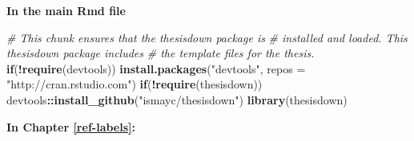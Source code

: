 \documentclass[12pt,twoside]{reedthesis}
\newenvironment{Shaded}{\begin{snugshade}}{\end{snugshade}}
\newcommand{\CommentTok}[1]{\textcolor[rgb]{0.56,0.35,0.01}{\textit{#1}}}
\newcommand{\ControlFlowTok}[1]{\textcolor[rgb]{0.13,0.29,0.53}{\textbf{#1}}}
\newcommand{\DataTypeTok}[1]{\textcolor[rgb]{0.13,0.29,0.53}{#1}}
\newcommand{\KeywordTok}[1]{\textcolor[rgb]{0.13,0.29,0.53}{\textbf{#1}}}
\newcommand{\NormalTok}[1]{#1}
\newcommand{\OperatorTok}[1]{\textcolor[rgb]{0.81,0.36,0.00}{\textbf{#1}}}
\newcommand{\StringTok}[1]{\textcolor[rgb]{0.31,0.60,0.02}{#1}}
\begin{document}
\textbf{In the main Rmd file}
\begin{Shaded}
\begin{Highlighting}[]
\CommentTok{# This chunk ensures that the thesisdown package is}
\CommentTok{# installed and loaded. This thesisdown package includes}
\CommentTok{# the template files for the thesis.}
\ControlFlowTok{if}\NormalTok{(}\OperatorTok{!}\KeywordTok{require}\NormalTok{(devtools))}
  \KeywordTok{install.packages}\NormalTok{(}\StringTok{"devtools"}\NormalTok{, }\DataTypeTok{repos =} \StringTok{"http://cran.rstudio.com"}\NormalTok{)}
\ControlFlowTok{if}\NormalTok{(}\OperatorTok{!}\KeywordTok{require}\NormalTok{(thesisdown))}
\NormalTok{  devtools}\OperatorTok{::}\KeywordTok{install_github}\NormalTok{(}\StringTok{"ismayc/thesisdown"}\NormalTok{)}
\KeywordTok{library}\NormalTok{(thesisdown)}
\end{Highlighting}
\end{Shaded}
\textbf{In Chapter \ref{ref-labels}:}
\end{document}
